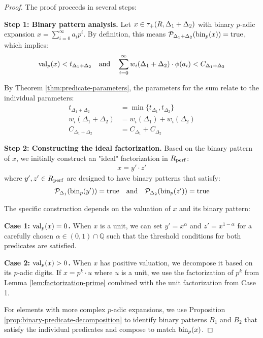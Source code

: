 \begin{proof}
The proof proceeds in several steps:

\textbf{Step 1: Binary pattern analysis.} 
Let $x \in \tau_+(R,\Delta_1+\Delta_2)$ with binary $p$-adic expansion $x = \sum_{i=0}^{\infty} a_i p^i$. By definition, this means $\mathcal{P}_{\Delta_1+\Delta_2}(\operatorname{bin}_p(x)) = \text{true}$, which implies:
\begin{align*}
\operatorname{val}_p(x) < t_{\Delta_1+\Delta_2} \quad \text{and} \quad \sum_{i=0}^{\infty} w_i(\Delta_1+\Delta_2) \cdot \phi(a_i) < C_{\Delta_1+\Delta_2}
\end{align*}

By Theorem \ref{thm:predicate-parameters}, the parameters for the sum relate to the individual parameters:
\begin{align*}
t_{\Delta_1+\Delta_2} &= \min\{t_{\Delta_1}, t_{\Delta_2}\} \\
w_i(\Delta_1+\Delta_2) &= w_i(\Delta_1) + w_i(\Delta_2) \\
C_{\Delta_1+\Delta_2} &= C_{\Delta_1} + C_{\Delta_2}
\end{align*}

\textbf{Step 2: Constructing the ideal factorization.}
Based on the binary pattern of $x$, we initially construct an "ideal" factorization in $R_{\operatorname{perf}}$:
\begin{align*}
x = y' \cdot z'
\end{align*}
where $y', z' \in R_{\operatorname{perf}}$ are designed to have binary patterns that satisfy:
\begin{align*}
\mathcal{P}_{\Delta_1}(\operatorname{bin}_p(y')) = \text{true} \quad \text{and} \quad \mathcal{P}_{\Delta_2}(\operatorname{bin}_p(z')) = \text{true}
\end{align*}

The specific construction depends on the valuation of $x$ and its binary pattern:

\textbf{Case 1: $\operatorname{val}_p(x) = 0$.} When $x$ is a unit, we can set $y' = x^{\alpha}$ and $z' = x^{1-\alpha}$ for a carefully chosen $\alpha \in (0,1) \cap \mathbb{Q}$ such that the threshold conditions for both predicates are satisfied.

\textbf{Case 2: $\operatorname{val}_p(x) > 0$.} When $x$ has positive valuation, we decompose it based on its $p$-adic digits. If $x = p^k \cdot u$ where $u$ is a unit, we use the factorization of $p^k$ from Lemma \ref{lem:factorization-prime} combined with the unit factorization from Case 1.

For elements with more complex $p$-adic expansions, we use Proposition \ref{prop:binary-predicate-decomposition} to identify binary patterns $B_1$ and $B_2$ that satisfy the individual predicates and compose to match $\operatorname{bin}_p(x)$.


\end{proof}
